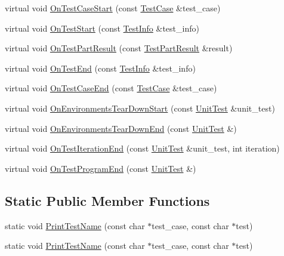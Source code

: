 \begin{DoxyCompactItemize}
virtual void \hyperlink{classtesting_1_1internal_1_1_pretty_unit_test_result_printer_aa78e3f43ff843a72d474da3c0b9530f2}{On\-Test\-Case\-Start} (const \hyperlink{classtesting_1_1_test_case}{Test\-Case} \&test\-\_\-case)
\item 
virtual void \hyperlink{classtesting_1_1internal_1_1_pretty_unit_test_result_printer_a8133130bf8254da0a78e39ac34155410}{On\-Test\-Start} (const \hyperlink{classtesting_1_1_test_info}{Test\-Info} \&test\-\_\-info)
\item 
virtual void \hyperlink{classtesting_1_1internal_1_1_pretty_unit_test_result_printer_a9c7ca0e58ea0fc96d635ed0cea410ed9}{On\-Test\-Part\-Result} (const \hyperlink{classtesting_1_1_test_part_result}{Test\-Part\-Result} \&result)
\item 
virtual void \hyperlink{classtesting_1_1internal_1_1_pretty_unit_test_result_printer_a6d4e21b076982d9eefb30373f1f5b6d2}{On\-Test\-End} (const \hyperlink{classtesting_1_1_test_info}{Test\-Info} \&test\-\_\-info)
\item 
virtual void \hyperlink{classtesting_1_1internal_1_1_pretty_unit_test_result_printer_aa3fa49847ce1214deba44c99e35a89f0}{On\-Test\-Case\-End} (const \hyperlink{classtesting_1_1_test_case}{Test\-Case} \&test\-\_\-case)
\item 
virtual void \hyperlink{classtesting_1_1internal_1_1_pretty_unit_test_result_printer_a30703edd3f8a434035a4977eeb49918d}{On\-Environments\-Tear\-Down\-Start} (const \hyperlink{classtesting_1_1_unit_test}{Unit\-Test} \&unit\-\_\-test)
\item 
virtual void \hyperlink{classtesting_1_1internal_1_1_pretty_unit_test_result_printer_ab23094ef3b714778b2f742d39818c280}{On\-Environments\-Tear\-Down\-End} (const \hyperlink{classtesting_1_1_unit_test}{Unit\-Test} \&)
\item 
virtual void \hyperlink{classtesting_1_1internal_1_1_pretty_unit_test_result_printer_a02ae3a9b477a559edeefe4f7c11134a2}{On\-Test\-Iteration\-End} (const \hyperlink{classtesting_1_1_unit_test}{Unit\-Test} \&unit\-\_\-test, int iteration)
\item 
virtual void \hyperlink{classtesting_1_1internal_1_1_pretty_unit_test_result_printer_a8c92c062889abdb940b04ffe113f5980}{On\-Test\-Program\-End} (const \hyperlink{classtesting_1_1_unit_test}{Unit\-Test} \&)
\end{DoxyCompactItemize}
\subsection*{Static Public Member Functions}
\begin{DoxyCompactItemize}
\item 
static void \hyperlink{classtesting_1_1internal_1_1_pretty_unit_test_result_printer_a5b60a9aed1db02837b11450f6e8d0f71}{Print\-Test\-Name} (const char $\ast$test\-\_\-case, const char $\ast$test)
\item 
static void \hyperlink{classtesting_1_1internal_1_1_pretty_unit_test_result_printer_a5b60a9aed1db02837b11450f6e8d0f71}{Print\-Test\-Name} (const char $\ast$test\-\_\-case, const char $\ast$test)
\end{DoxyCompactItemize}


